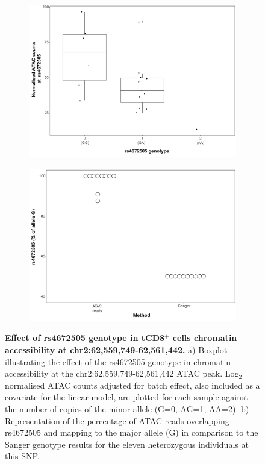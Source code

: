 \begin{figure}[htbp]
\centering
\begin{subfigure}{0.45\textwidth}
\centering
\includegraphics[width=\textwidth]{./Results2/pdfs/ATAC_caQTL_CD8_final}
\caption{\textbf{}}
\end{subfigure}%
\begin{subfigure}{0.45\textwidth}
\centering
\includegraphics[width=\textwidth]{./Results2/pdfs/chr2p15_rs4672505_allelic_imbalance_CD8_final}
\caption{\textbf{}}
\end{subfigure}
\caption[Effect of rs4672505 genotype in tCD8$^+$ cells chromatin accessibility at chr2:62,559,749-62,561,442.]{\textbf{Effect of rs4672505 genotype in tCD8$^+$ cells chromatin accessibility at chr2:62,559,749-62,561,442.} a) Boxplot illustrating the effect of the rs4672505 genotype in chromatin accessibility at the chr2:62,559,749-62,561,442 ATAC peak. Log$_2$ normalised ATAC counts adjusted for batch effect, also included as a covariate for the linear model, are plotted for each sample against the number of copies of the minor allele (G=0, AG=1, AA=2). b) Representation of the percentage of ATAC reads overlapping rs4672505 and mapping to the major allele (G) in comparison to the Sanger genotype results for the eleven heterozygous individuals at this SNP.}
\label{figure:ATAC_PS_CTL_caQTL_and_allelic_imbalance}
\end{figure} 
 
